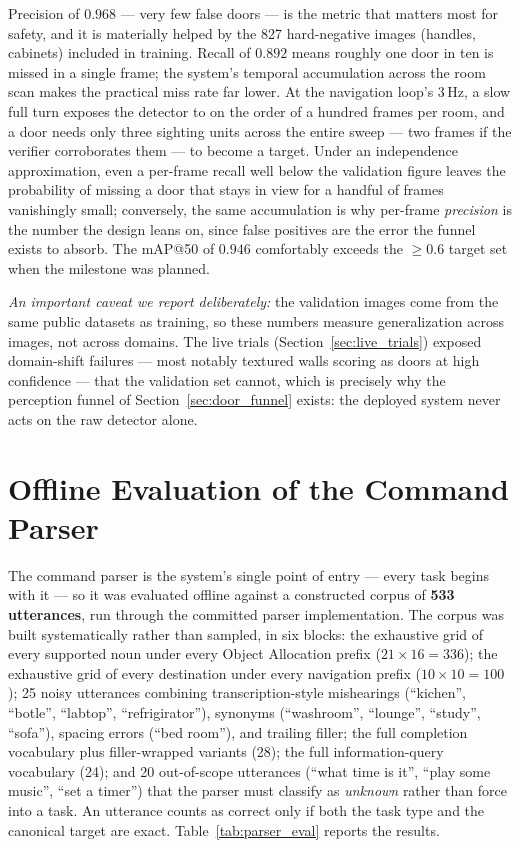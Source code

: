 Precision of $0.968$ --- very few false doors --- is the metric that matters most
for safety, and it is materially helped by the 827 hard-negative images (handles,
cabinets) included in training. Recall of $0.892$ means roughly one door in ten is
missed in a single frame; the system's temporal accumulation across the room scan
makes the practical miss rate far lower. At the navigation loop's 3\,Hz, a slow
full turn exposes the detector to on the order of a hundred frames per room, and a
door needs only three sighting units across the entire sweep --- two frames if the
verifier corroborates them --- to become a target. Under an independence
approximation, even a per-frame recall well below the validation figure leaves the
probability of missing a door that stays in view for a handful of frames
vanishingly small; conversely, the same accumulation is why per-frame
\emph{precision} is the number the design leans on, since false positives are the
error the funnel exists to absorb. The mAP@50 of $0.946$ comfortably exceeds the
${\geq}0.6$ target set when the milestone was planned.

\emph{An important caveat we report deliberately:} the validation images come from
the same public datasets as training, so these numbers measure generalization
across images, not across domains. The live trials
(Section~\ref{sec:live_trials}) exposed domain-shift failures --- most notably
textured walls scoring as doors at high confidence --- that the validation set
cannot, which is precisely why the perception funnel of
Section~\ref{sec:door_funnel} exists: the deployed system never acts on the raw
detector alone.

\section{Offline Evaluation of the Command Parser}
\label{sec:parser_eval}

The command parser is the system's single point of entry --- every task begins
with it --- so it was evaluated offline against a constructed corpus of
\textbf{533 utterances}, run through the committed parser implementation. The
corpus was built systematically rather than sampled, in six blocks: the exhaustive
grid of every supported noun under every Object Allocation prefix
($21\times16=336$); the exhaustive grid of every destination under every
navigation prefix ($10\times10=100$); 25 noisy utterances combining
transcription-style mishearings (``kichen'', ``botle'', ``labtop'',
``refrigirator''), synonyms (``washroom'', ``lounge'', ``study'', ``sofa''),
spacing errors (``bed room''), and trailing filler; the full completion vocabulary
plus filler-wrapped variants (28); the full information-query vocabulary (24);
and 20 out-of-scope utterances (``what time is it'', ``play some music'', ``set a
timer'') that the parser must classify as \emph{unknown} rather than force into a
task. An utterance counts as correct only if both the task type and the canonical
target are exact. Table~\ref{tab:parser_eval} reports the results.

